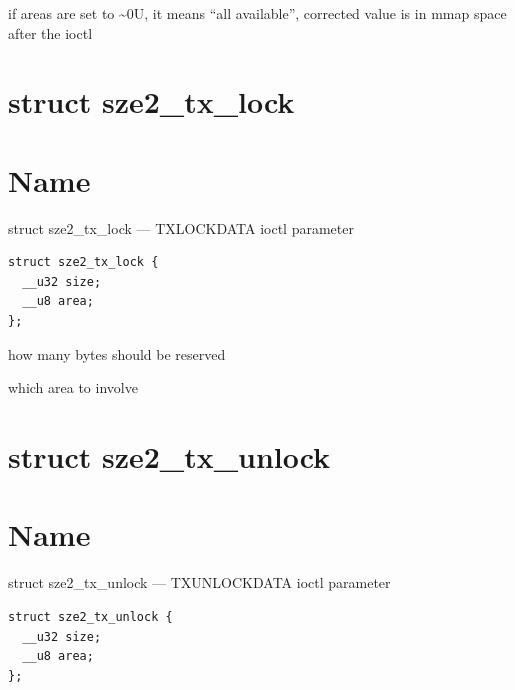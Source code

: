 if areas are set to \textasciitilde{}0U, it means {``}all available{''}, corrected value is in mmap space after the ioctl
% 
\section*{struct sze2\_tx\_lock}
\label{API-struct-sze2-tx-lock}\hypertarget{API-struct-sze2-tx-lock}{}%
\label{id206682}

\section*{Name}
struct sze2\_tx\_lock --- TXLOCKDATA ioctl parameter\label{id206692}

\begin{Verbatim}[]
struct sze2_tx_lock {
  __u32 size;
  __u8 area;
};  
\end{Verbatim}

\label{id206704}

\begin{kdocdescription}
\item[{size}]
how many bytes should be reserved
\item[{area}]
which area to involve
\end{kdocdescription}
\noindent %
\section*{struct sze2\_tx\_unlock}
\label{API-struct-sze2-tx-unlock}\hypertarget{API-struct-sze2-tx-unlock}{}%
\label{id206775}

\section*{Name}
struct sze2\_tx\_unlock --- TXUNLOCKDATA ioctl parameter\label{id206785}

\begin{Verbatim}[]
struct sze2_tx_unlock {
  __u32 size;
  __u8 area;
};  
\end{Verbatim}

